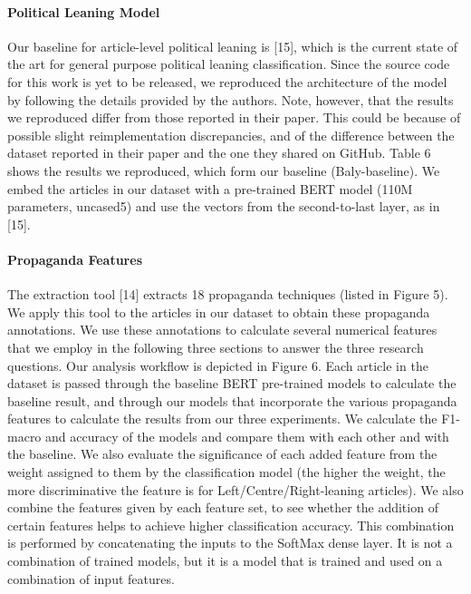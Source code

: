 \paragraph{Political Leaning Model}
Our baseline for article-level political leaning is [15], which is the current state of the art for general purpose political leaning classification. Since the source code for this work is yet to be released, we reproduced the architecture of the model by following the details provided by the authors. Note, however, that the results we reproduced differ from those reported in their paper. This could be because of possible slight reimplementation discrepancies, and of the difference between the dataset reported in their paper and the one they shared on GitHub. Table 6 shows the results we reproduced, which form our baseline (Baly-baseline).
We embed the articles in our dataset with a pre-trained BERT model (110M parameters, uncased5) and use the vectors from the second-to-last layer, as in [15].


\paragraph{Propaganda Features}
The extraction tool [14] extracts 18 propaganda techniques (listed in Figure 5). We apply this tool to the articles in our dataset to obtain these propaganda annotations. We use these annotations to calculate several numerical features that we employ in the following three sections to answer the three research questions.
Our analysis workflow is depicted in Figure 6. Each article in the dataset is passed through the baseline BERT pre-trained models to calculate the baseline result, and through our models that incorporate the various propaganda features to calculate the results from our three experiments.
We calculate the F1-macro and accuracy of the models and compare them with each other and with the baseline. We also evaluate the significance of each added feature from the weight assigned to them by the classification model (the higher the weight, the more discriminative the feature is for Left/Centre/Right-leaning articles). We also combine the features given by each feature set, to see whether the addition of certain features helps to achieve higher classification accuracy. This combination is performed by concatenating the inputs to the SoftMax dense layer. It is not a combination of trained models, but it is a model that is trained and used on a combination of input features.

